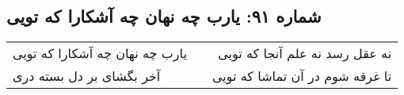 \begin{center}
\section*{شماره ۹۱: یارب چه نهان چه آشکارا که تویی}
\label{sec:091}
\begin{longtable}{l p{0.5cm} r}
یارب چه نهان چه آشکارا که تویی
&&
نه عقل رسد نه علم آنجا که تویی
\\
آخر بگشای بر دل بسته دری
&&
تا غرقه شوم در آن تماشا که تویی
\\
\end{longtable}
\end{center}
